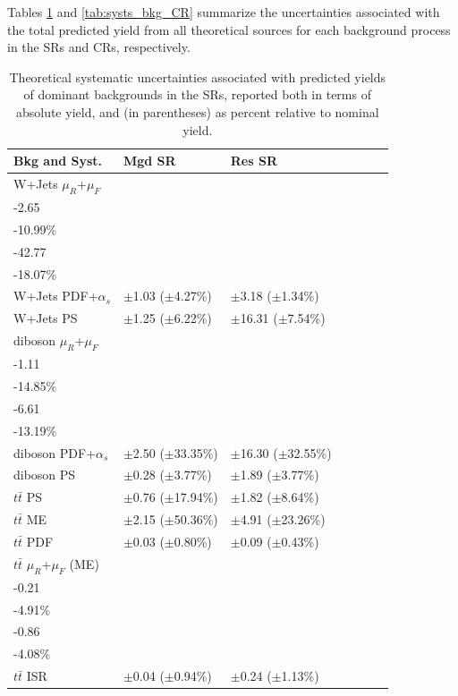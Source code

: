 Tables \ref{tab:systs_bkg_SR} and \ref{tab:systs_bkg_CR} summarize the uncertainties associated with the total predicted yield from all theoretical sources for each background process in the SRs and CRs, respectively. 

\begin{table}[ht]
\small{
\caption{\label{tab:systs_bkg_SR} Theoretical systematic uncertainties associated with predicted yields of dominant backgrounds in the SRs, reported both in terms of absolute yield, and (in parentheses) as percent relative to nominal yield.}
\begin{tabular}{l l l l l l l }
\toprule
\textbf{Bkg and Syst.} & \textbf{Mgd SR} & \textbf{Res SR}\tabularnewline
\midrule
\midrule
W+Jets \(\mu_R\)+\(\mu_F\)  & \(\substack{+4.85\\-2.65}\) \big(\(\substack{+20.15\%\\-10.99\%}\)\big) & \(\substack{+33.92\\-42.77}\) \big(\(\substack{+14.33\%\\-18.07\%}\)\big) \tabularnewline
\midrule
W+Jets PDF+\(\alpha_s\) & \(\pm\)1.03 (\(\pm\)4.27\%) &\(\pm\)3.18 (\(\pm\)1.34\%) \tabularnewline
\midrule
W+Jets PS & \(\pm\)1.25 (\(\pm\)6.22\%) & \(\pm\)16.31 (\(\pm\)7.54\%) \tabularnewline
\midrule
diboson \(\mu_R\)+\(\mu_F\) & \(\substack{+1.26\\-1.11}\) \big(\(\substack{+16.82\%\\-14.85\%}\)\big) & \(\substack{+7.62\\-6.61}\) \big(\(\substack{+15.22\%\\-13.19\%}\)\big) \tabularnewline
\midrule
diboson PDF+\(\alpha_s\) & \(\pm\)2.50 (\(\pm\)33.35\%) &\(\pm\)16.30 (\(\pm\)32.55\%) \tabularnewline
\midrule
diboson PS & \(\pm\)0.28 (\(\pm\)3.77\%) &\(\pm\)1.89 (\(\pm\)3.77\%) \tabularnewline
\midrule
\(t\bar{t}\) PS & \(\pm\)0.76 (\(\pm\)17.94\%) &\(\pm\)1.82 (\(\pm\)8.64\%) \tabularnewline
\midrule
\(t\bar{t}\) ME & \(\pm\)2.15 (\(\pm\)50.36\%) &\(\pm\)4.91 (\(\pm\)23.26\%) \tabularnewline
\midrule
\(t\bar{t}\) PDF & \(\pm\)0.03 (\(\pm\)0.80\%) &\(\pm\)0.09 (\(\pm\)0.43\%) \tabularnewline
\midrule
\(t\bar{t}\) \(\mu_R\)+\(\mu_F\) (ME) & \(\substack{+0.16\\-0.21}\) \big(\(\substack{+3.74\%\\-4.91\%}\)\big) & \(\substack{+0.59\\-0.86}\) \big(\(\substack{+2.79\%\\-4.08\%}\)\big) \tabularnewline
\midrule
\(t\bar{t}\) ISR & \(\pm\)0.04 (\(\pm\)0.94\%) &\(\pm\)0.24 (\(\pm\)1.13\%) \tabularnewline

\end{tabular}}
\end{table}
